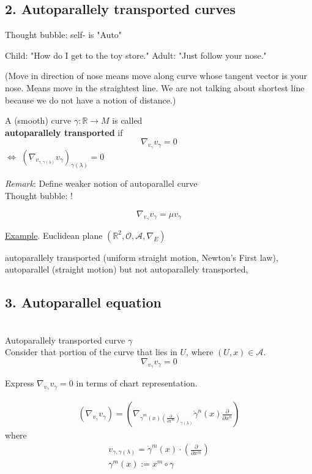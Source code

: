 			

								


	
	\subsection*{2. Autoparallely transported curves}
	Thought bubble: self- is "Auto"
	
	Child: "How do I get to the toy store." Adult: "Just follow your nose." 
	
	(Move in direction of nose means move along curve whose tangent vector is your nose. Means move in the straightest line. We are not talking about shortest line because we do not have a notion of distance.)
	
	\begin{definition}
		A (smooth) curve $\gamma: \mathbb{R} \to M$ is called \\
		\textbf{autoparallely transported} if 
		\begin{equation}
		\nabla_{v_{\gamma}}v_{\gamma} = 0
		\end{equation}
	$\Longleftrightarrow $ $\left( \nabla_{v_{\gamma, \gamma(\lambda)}} v_{\gamma} \right)_{\gamma(\lambda)} = 0$ 
	\end{definition}
	
\emph{Remark}: Define weaker notion of autoparallel curve \\
Thought bubble: !

\[
\nabla_{v_{\gamma}} v_{\gamma} = \mu v_{\gamma} 
\]

\underline{Example}. Euclidean plane $(\mathbb{R}^2, \mathcal{O}, \mathcal{A}, \nabla_E)$

autoparallely transported (uniform straight motion, Newton's First law), autoparallel (straight motion) but not autoparallely transported, 

\subsection*{3. Autoparallel equation}

\quad \\
Autoparallely transported curve $\gamma$ \\
Consider that portion of the curve that lies in $U$, where $(U, x) \in \mathcal{A}$.
\[
\nabla_{v_{\gamma}} v_{\gamma} = 0 
\]

Express $\nabla_{v_{\gamma}} v_{\gamma} = 0$ in terms of chart representation.

\[
\begin{gathered}
 (\nabla_{v_{\gamma}} v_{\gamma}) = \left( \nabla_{\dot{\gamma}^m(x)\left( \frac{\partial}{\partial x^m} \right)_{\gamma(\lambda)} } \dot{\gamma}^n(x) \frac{\partial}{\partial x^n} \right) 
\end{gathered}
\]
where
\[
\begin{gathered} 
	v_{\gamma, \gamma(\lambda)} = \dot{\gamma}^m(x) \cdot \left( \frac{\partial}{\partial x^m} \right) \\ 
	\gamma^m(x) := x^m \circ \gamma 
\end{gathered} 
\]

